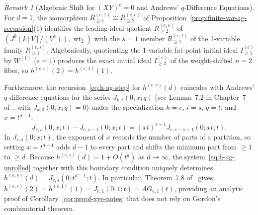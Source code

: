 \documentclass[a4paper, 12pt]{amsart}
\theoremstyle{remark}
\newtheorem{remark}[theorem]{Remark}
\begin{document}
\begin{remark}[Algebraic Shift for $(XY)^e = 0$ and Andrews' $q$-Difference Equations]
\label{rmk:algebraic-shift-s1}
For $d = 1$,
the isomorphism $R_{\ge 1}^{(e, 1)} \cong R_{\ge 2}^{(e, e)}$ of Proposition~\ref{prop:finite-var-ag-recursion}(1)
identifies the leading-ideal quotient $R_{\ge 2}^{(e, e)}$ of $(J^0(k[V]/(V^e)), \operatorname{wt}_2)$
with the $s = 1$ member $R_{\ge 1}^{(e, 1)}$ of the 1-variable family $R_{\ge 1}^{(e, s)}$.
Algebraically,
quotienting the 1-variable fat-point initial ideal $I_{\ge 1}^{(e)}$ by $W^{(1)}$ ($s = 1$) produces the exact initial ideal $I_{\ge 2}^{(e)}$ of the weight-shifted $n = 2$ fiber,
so $h^{(e, e)}(2) = h^{(e, 1)}(1)$.

Furthermore,
the recursion~\eqref{eq:h-ag-step} for $h^{(e, s)}(d)$ coincides with Andrews' $q$-difference equations for the series $J_{k, i}(0; x; q)$
(see Lemma~7.2 in Chapter~7 of~\cite{andrews_partitions_1976}, with $J_{k, 0}(0; x; q) = 0$)
under the specialization $k = e$, $i = s$, $q = t$, and $x = t^{d - 1}$:
\begin{equation*}
  J_{e, s}(0; x; t) - J_{e, s - 1}(0; x; t) = (x t)^{s - 1} J_{e, e - s + 1}(0; x t; t).
\end{equation*}
In $J_{e, s}(0; x; t)$,
the exponent of $x$ records the number of parts of a partition,
so setting $x = t^{d - 1}$ adds $d - 1$ to every part and shifts the minimum part from $\ge 1$ to $\ge d$.
Because $h^{(e, s)}(d) = 1 + O(t^d)$ as $d \to \infty$,
the system~\eqref{eq:h-ag-unrolled} together with this boundary condition uniquely determines $h^{(e, s)}(d) = J_{e, s}(0; t^{d - 1}; t)$.
In particular,
Theorem~7.8 of~\cite{andrews_partitions_1976} gives $h^{(e, e)}(2) = h^{(e, 1)}(1) = J_{e, 1}(0; 1; t) = AG_{e, 1}(t)$,
providing an analytic proof of Corollary~\ref{cor:proof-xye-notes} that does not rely on Gordon's combinatorial theorem.
\end{remark}
\end{document}
